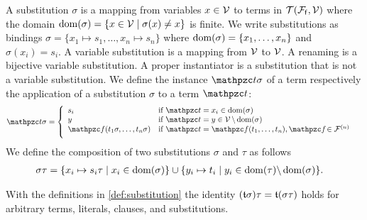 
\begin{definition}\label{def:substitution}
	A {\myem substitution} $\sigma$ is a mapping from variables $x\in{\mathcal V}$ to terms in ${{\mathcal T}({\mathcal F}_{\mathsf f},{\mathcal V})}$
	where the {\myem domain }$\operatorname{dom}(\sigma) = \{ x\in{\mathcal V}\mid\sigma(x) \neq x \}$ is finite.
	We write substitutions as bindings $\sigma=\{ x_1\mapsto s_1,\ldots,x_n\mapsto s_n \}$
	where $\operatorname{dom}(\sigma)=\{ x_1,\ldots,x_n \}$ and $\sigma(x_i)=s_i$.
	A {\myem variable substitution} is a mapping from ${\mathcal V}$ to ${\mathcal V}$.
	A {\myem renaming} is a bijective variable substitution.
	A {\myem proper instantiator} is a substitution that is not a variable substitution.
	We define the instance $\mct\sigma$ of a term
	respectively the application of a substitution $\sigma$ to a term $\mct$:
	\begin{align*}
		\mct\sigma &= \left\{\begin{array}{ll}
			s_i 				& \text{if }\mct=x_i\in\dom(\sigma)\\
			y					& \text{if }\mct=y\in\mcV\,\backslash\dom(\sigma)\\
			\mcf(t_1\sigma,\ldots,t_n\sigma)	&\text{if }\mct=\mcf(t_1,\ldots,t_n), \mcf\!\in\mcFn \\[0.5em]
		\end{array}\right.	
	\end{align*}
%	
	We define the {\myem composition} of two substitutions $\sigma$ and $\tau$ as follows
	\begin{align*}
		\sigma\tau&=\{ x_i\mapsto s_i\tau\mid x_i\in\operatorname{dom}(\sigma) \}
		\cup
		\{ y_i\mapsto t_i\mid y_i\in\operatorname{dom}(\tau) \backslash \operatorname{dom}(\sigma) \}.
	\end{align*}
	
\end{definition}

\begin{lemma}\label{lem:substitution}
	With the definitions in \ref{def:substitution} the identity
	$({\mathfrak t}\sigma)\tau = {\mathfrak t}(\sigma\tau)$ holds for
	arbitrary terms, literals, clauses, and substitutions.
\end{lemma}